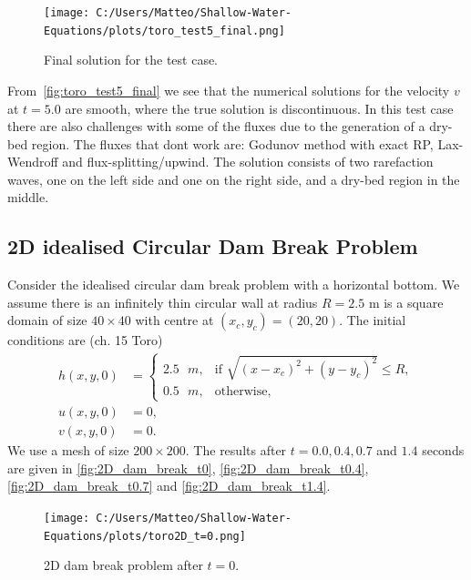 \begin{figure}[H]
    \centering
    \texttt{[image: C:/Users/Matteo/Shallow-Water-Equations/plots/toro\_test5\_final.png]}
    \caption{Final solution for the test case.}\label{fig:toro_test5_final}
\end{figure}
From~\autoref{fig:toro_test5_final} we see that the numerical solutions for the velocity $v$ at $t=5.0$ are smooth, where the true solution is discontinuous. 
In this test case there are also challenges with some of the fluxes due to the generation of a dry-bed region.
The fluxes that dont work are: Godunov method with exact RP, Lax-Wendroff and flux-splitting/upwind.
The solution consists of two rarefaction waves, one on the left side and one on the right side, and a dry-bed region in the middle.

\subsection{2D idealised Circular Dam Break Problem}
Consider the idealised circular dam break problem with a horizontal bottom.
We assume there is an infinitely thin circular wall at radius $R = 2.5$ m is a square domain of size $40 \times 40 $ with centre at $(x_c,y_c) = (20, 20)$.
The initial conditions are (ch. 15 Toro)
\begin{align*}
    h(x,y,0) &= \begin{cases}
        2.5 \text{ }m, & \text{if } \sqrt{ {(x-x_c)}^2 + {(y-y_c)}^2 } \leq R, \\
        0.5 \text{ }m, & \text{otherwise},
    \end{cases} \\
    u(x,y,0) &= 0, \\
    v(x,y,0) &= 0.
\end{align*}
We use a mesh of size $200 \times 200$.
The results after $t=0.0, 0.4, 0.7$ and $1.4$ seconds are given in \autoref{fig:2D_dam_break_t0}, \autoref{fig:2D_dam_break_t0.4}, \autoref{fig:2D_dam_break_t0.7} and \autoref{fig:2D_dam_break_t1.4}.

\begin{figure}[H]
    \centering
    \texttt{[image: C:/Users/Matteo/Shallow-Water-Equations/plots/toro2D\_t=0.png]}
    \caption{2D dam break problem after $t=0$.}\label{fig:2D_dam_break_t0}
\end{figure}

